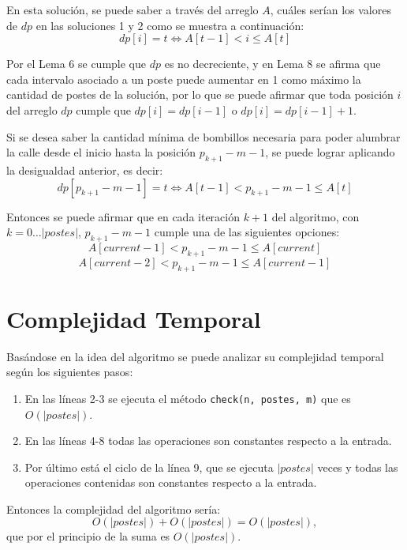 \documentclass{article}
\begin{document}
En esta solución, se puede saber a través del arreglo \( A \), cuáles serían los valores de \( dp \) en las soluciones 1 y 2 como se muestra a continuación:
\[
dp[i] = t \iff A[t - 1] < i \leq A[t]
\]

Por el Lema 6 se cumple que \( dp \) es no decreciente, y en Lema 8 se afirma que cada intervalo asociado a un poste puede aumentar en 1 como máximo la cantidad de postes de la solución, por lo que se puede afirmar que toda posición \( i \) del arreglo \( dp \) cumple que \( dp[i] = dp[i - 1] \) o \( dp[i] = dp[i - 1] + 1 \).

Si se desea saber la cantidad mínima de bombillos necesaria para poder alumbrar la calle desde el inicio hasta la posición \( p_{k+1} - m - 1 \), se puede lograr aplicando la desigualdad anterior, es decir:
\[
dp[p_{k+1} - m - 1] = t \iff A[t - 1] < p_{k+1} - m - 1 \leq A[t]
\]

Entonces se puede afirmar que en cada iteración \( k + 1 \) del algoritmo, con \( k = 0 \ldots |postes| \), \( p_{k+1} - m - 1 \) cumple una de las siguientes opciones:
\[
A[current - 1] < p_{k+1} - m - 1 \leq A[current]
\]
\[
A[current - 2] < p_{k+1} - m - 1 \leq A[current-1]
\]


\section*{Complejidad Temporal}

Basándose en la idea del algoritmo se puede analizar su complejidad temporal según los siguientes pasos:

\begin{enumerate}
    \item En las líneas 2-3 se ejecuta el método \texttt{check(n, postes, m)} que es \( O(|postes|) \).
    \item En las líneas 4-8 todas las operaciones son constantes respecto a la entrada.
    \item Por último está el ciclo de la línea 9, que se ejecuta \( |postes| \) veces y todas las operaciones contenidas son constantes respecto a la entrada.
\end{enumerate}

Entonces la complejidad del algoritmo sería:
\[
O(|postes|) + O(|postes|) = O(|postes|),
\]
que por el principio de la suma es \( O(|postes|) \).
\end{document}

